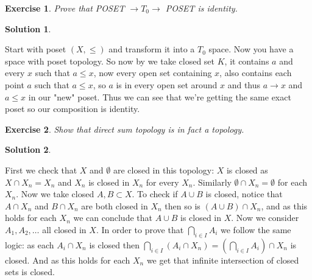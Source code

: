 \documentclass[11pt,a4paper]{article}
\newtheorem{Ex}{Exercise}
\newtheorem{Sol}{Solution}
\newcommand{\ra}{\rightarrow}
\begin{document}
\begin{Ex}
	Prove that POSET $\ra T_0 \ra$ POSET is identity.
\end{Ex}
\begin{Sol}
\end{Sol}
\noindent Start with poset $(X, \le)$ and transform it into a $T_0$ space. Now you have a space with poset topology. So now by we take closed set $K$, it contains $a$ and every $x$ such that $a\le x$, now every open set containing $x$, also contains each point $a$ such that $a \le x$, so $a$ is in every open set around $x$ and thus $a \ra x$ and $a \le x$ in our "new" poset. Thus we can see that we're getting the same exact poset so our composition is identity.


\begin{Ex}
	Show that direct sum topology is in fact a topology.
\end{Ex}

\begin{Sol}
\end{Sol}
\noindent First we check that $X$ and $\emptyset$ are closed in this topology: $X$ is closed as $X \cap X_n = X_n$ and $X_n$ is closed in $X_n$ for every $X_n$. Similarly $\emptyset \cap X_n = \emptyset$ for each $X_n$. Now we take closed $A,B \subset X$. To check if $A\cup B$ is closed, notice that $A \cap X_n$ and $B \cap X_n$ are both closed in $X_n$ then so is $(A \cup B) \cap X_n$, and as this holds for each $X_n$ we can conclude that $A \cup B$ is closed in $X$. Now we consider $A_1, A_2,\dots$ all closed in $X$. In order to prove that $\bigcap_{i\in I}A_i$ we follow the same logic: as each $A_i \cap X_n$ is closed then $\bigcap_{i \in I}(A_i \cap X_n) = (\bigcap_{i\in I}A_i) \cap X_n$ is closed. And as this holds for each $X_n$ we get that infinite intersection of closed sets is closed. 
\end{document}
